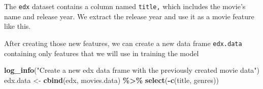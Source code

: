 \documentclass[
]{article}
\newenvironment{Shaded}{\begin{snugshade}}{\end{snugshade}}
\newcommand{\AttributeTok}[1]{\textcolor[rgb]{0.13,0.29,0.53}{#1}}
\newcommand{\FunctionTok}[1]{\textcolor[rgb]{0.13,0.29,0.53}{\textbf{#1}}}
\newcommand{\NormalTok}[1]{#1}
\newcommand{\OtherTok}[1]{\textcolor[rgb]{0.56,0.35,0.01}{#1}}
\newcommand{\SpecialCharTok}[1]{\textcolor[rgb]{0.81,0.36,0.00}{\textbf{#1}}}
\newcommand{\StringTok}[1]{\textcolor[rgb]{0.31,0.60,0.02}{#1}}
\begin{document}
The \texttt{edx} dataset contains a column named \texttt{title,} which
includes the movie's name and release year. We extract the release year
and use it as a movie feature like this.

\begin{Shaded}
\end{Shaded}

After creating those new features, we can create a new data frame
\texttt{edx.data} containing only features that we will use in training
the model

\begin{Shaded}
\begin{Highlighting}[]
\FunctionTok{log\_info}\NormalTok{(}\StringTok{"Create a new edx data frame with the previously created movie data"}\NormalTok{)}
\NormalTok{edx.data }\OtherTok{\textless{}{-}} \FunctionTok{cbind}\NormalTok{(edx, movies.data) }\SpecialCharTok{\%\textgreater{}\%}
  \FunctionTok{select}\NormalTok{(}\SpecialCharTok{{-}}\FunctionTok{c}\NormalTok{(title, genres))}
\end{Highlighting}
\end{Shaded}
\end{document}
